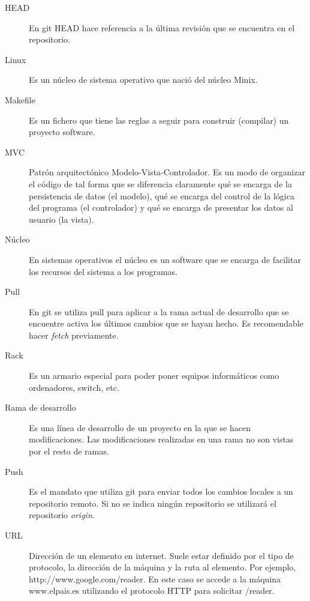 \begin{description}
	\item[HEAD] En git HEAD hace referencia a la última revisión que se encuentra en el repositorio.

	\item[Linux] Es un núcleo de sistema operativo que nació del núcleo Minix.
	
	\item[Makefile] Es un fichero que tiene las reglas a seguir para construir (compilar) un proyecto software.
	
	\item[MVC] Patrón arquitectónico Modelo-Vista-Controlador. Es un modo de organizar el código de tal forma que se diferencia claramente qué se encarga de la persistencia de datos (el modelo), qué se encarga del control de la lógica del programa (el controlador) y qué se encarga de presentar los datos al usuario (la vista).
	
	\item[Núcleo] En sistemas operativos el núcleo es un software que se encarga de facilitar los recursos del sistema a los programas.
	
	\item[Pull] En git se utiliza pull para aplicar a la rama actual de desarrollo que se encuentre activa los últimos cambios que se hayan hecho. Es recomendable hacer \emph{fetch} previamente.
	
	\item[Rack] Es un armario especial para poder poner equipos informáticos como ordenadores, switch, etc.
	
	\item[Rama de desarrollo] Es una línea de desarrollo de un proyecto en la que se hacen modificaciones. Las modificaciones realizadas en una rama no son vistas por el resto de ramas.
	
	\item[Push] Es el mandato que utiliza git para enviar todos los cambios locales a un repositorio remoto. Si no se indica ningún repositorio se utilizará el repositorio \emph{origin}.
	
	
	\item[URL] Dirección de un elemento en internet. Suele estar definido por el tipo de protocolo, la dirección de la máquina y la ruta al elemento. Por ejemplo, http://www.google.com/reader. En este caso se accede a la máquina www.elpais.es utilizando el protocolo HTTP para solicitar /reader.
\end{description}
